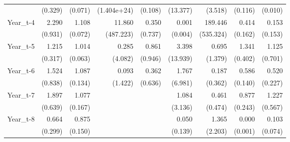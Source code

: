 \begin{table}[htbp]
\begin{tabular}{l*{8}{D{.}{.}{-1}}}
                    &     (0.329)         &     (0.071)         & (1.404e+24)         &     (0.108)         &    (13.377)         &     (3.518)         &     (0.116)         &     (0.010)         \\
Year\_t-4            &       2.290\sym{**} &       1.108\sym{\%}  &      11.860         &       0.350         &       0.001\sym{*}  &     189.446\sym{*}  &       0.414\sym{**} &       0.153\sym{*}  \\
                    &     (0.931)         &     (0.072)         &   (487.223)         &     (0.737)         &     (0.004)         &   (535.324)         &     (0.162)         &     (0.153)         \\
Year\_t-5            &       1.215         &       1.014         &       0.285         &       0.861         &       3.398         &       0.695         &       1.341         &       1.125         \\
                    &     (0.317)         &     (0.063)         &     (4.082)         &     (0.946)         &    (13.939)         &     (1.379)         &     (0.402)         &     (0.701)         \\
Year\_t-6            &       1.524         &       1.087         &       0.093         &       0.362         &       1.767         &       0.187         &       0.586\sym{**} &       0.520\sym{\%}  \\
                    &     (0.838)         &     (0.134)         &     (1.422)         &     (0.636)         &     (6.981)         &     (0.362)         &     (0.140)         &     (0.227)         \\
Year\_t-7            &       1.897\sym{*}  &       1.077         &                     &                     &       1.084         &       0.461         &       0.877         &       1.227         \\
                    &     (0.639)         &     (0.167)         &                     &                     &     (3.136)         &     (0.474)         &     (0.243)         &     (0.567)         \\
Year\_t-8            &       0.664         &       0.875         &                     &                     &       0.050         &       1.365         &       0.000\sym{**} &       0.103\sym{***}\\
                    &     (0.299)         &     (0.150)         &                     &                     &     (0.139)         &     (2.203)         &     (0.001)         &     (0.074)         \\

\end{tabular}
\end{table}
